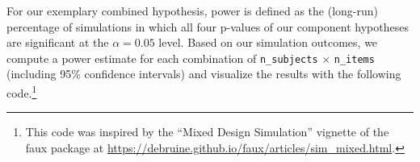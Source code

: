 \documentclass[
  man,floatsintext]{apa6}
\newenvironment{Shaded}{\begin{snugshade}}{\end{snugshade}}
\newcommand{\AttributeTok}[1]{\textcolor[rgb]{0.13,0.29,0.53}{#1}}
\newcommand{\FloatTok}[1]{\textcolor[rgb]{0.00,0.00,0.81}{#1}}
\newcommand{\FunctionTok}[1]{\textcolor[rgb]{0.13,0.29,0.53}{\textbf{#1}}}
\newcommand{\NormalTok}[1]{#1}
\newcommand{\OtherTok}[1]{\textcolor[rgb]{0.56,0.35,0.01}{#1}}
\newcommand{\SpecialCharTok}[1]{\textcolor[rgb]{0.81,0.36,0.00}{\textbf{#1}}}
\newcommand{\StringTok}[1]{\textcolor[rgb]{0.31,0.60,0.02}{#1}}
\begin{document}
For our exemplary combined hypothesis, power is defined as the (long-run) percentage of simulations in which all four p-values of our component hypotheses are significant at the \(\alpha = 0.05\) level. Based on our simulation outcomes, we compute a power estimate for each combination of \texttt{n\_subjects} \(\times\) \texttt{n\_items} (including 95\% confidence intervals) and visualize the results with the following code.\footnote{This code was inspired by the ``Mixed Design Simulation'' vignette of the faux package at \url{https://debruine.github.io/faux/articles/sim_mixed.html}.}

\begin{Shaded}
\end{Shaded}
\end{document}
